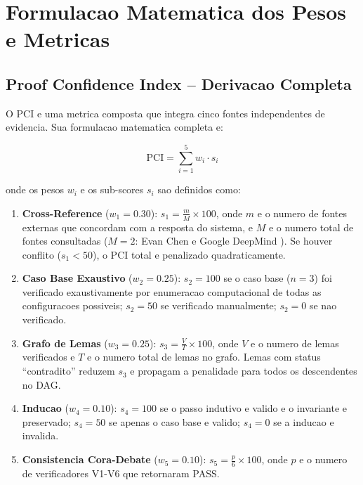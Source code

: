 \documentclass[5p]{elsarticle}
\begin{document}
\section{Formulacao Matematica dos Pesos e Metricas}

\subsection{Proof Confidence Index -- Derivacao Completa}

O PCI e uma metrica composta que integra cinco fontes independentes de evidencia.
Sua formulacao matematica completa e:

\begin{equation}\label{eq:pci_full}
 \text{PCI} = \sum_{i=1}^{5} w_i \cdot s_i
\end{equation}

onde os pesos $w_i$ e os sub-scores $s_i$ sao definidos como:

\begin{enumerate}[label=(\alph*)]
 \item \textbf{Cross-Reference} ($w_1=0.30$): $s_1 = \frac{m}{M}\times 100$,
 onde $m$ e o numero de fontes externas que concordam com a resposta do
 sistema, e $M$ e o numero total de fontes consultadas ($M=2$: Evan Chen
 \cite{chen2025} e Google DeepMind \cite{deepmind2025}). Se houver conflito
 ($s_1<50$), o PCI total e penalizado quadraticamente.

 \item \textbf{Caso Base Exaustivo} ($w_2=0.25$): $s_2 = 100$ se o caso base
 ($n=3$) foi verificado exaustivamente por enumeracao computacional de todas
 as configuracoes possiveis; $s_2 = 50$ se verificado manualmente; $s_2 = 0$
 se nao verificado.

 \item \textbf{Grafo de Lemas} ($w_3=0.25$): $s_3 = \frac{V}{T}\times 100$,
 onde $V$ e o numero de lemas verificados e $T$ e o numero total de lemas
 no grafo. Lemas com status ``contradito'' reduzem $s_3$ e propagam a
 penalidade para todos os descendentes no DAG.

 \item \textbf{Inducao} ($w_4=0.10$): $s_4 = 100$ se o passo indutivo e
 valido e o invariante e preservado; $s_4 = 50$ se apenas o caso base e
 valido; $s_4 = 0$ se a inducao e invalida.

 \item \textbf{Consistencia Cora-Debate} ($w_5=0.10$): $s_5 = \frac{p}{6}\times 100$,
 onde $p$ e o numero de verificadores V1-V6 que retornaram PASS.
\end{enumerate}
\end{document}
